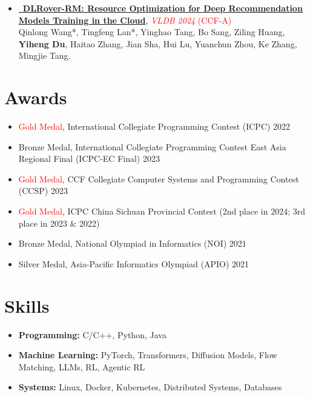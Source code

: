 \documentclass[10pt,a4paper]{article}
\newcommand{\dateright}[1]{\hfill {\small #1}}
\newcommand{\itemtitle}[1]{\textbf{#1}}
\newcommand{\pdficon}{}   %
\begin{document}
\begin{itemize}
  \item \href{https://doi.org/10.14778/3685800.3685832}{\pdficon\ \textbf{DLRover-RM: Resource Optimization for Deep Recommendation Models Training in the Cloud}}, 
  \textcolor{red}{\textit{VLDB 2024} (CCF-A)}\\
  Qinlong Wang*, Tingfeng Lan*, Yinghao Tang, Bo Sang, Ziling Huang, \textbf{Yiheng Du}, Haitao Zhang, Jian Sha, Hui Lu, Yuanchun Zhou, Ke Zhang, Mingjie Tang.
\end{itemize}



\section*{Awards}
\begin{itemize}
  \item \textcolor{red}{Gold Medal}, International Collegiate Programming Contest (ICPC)  \dateright{2022}
  \item Bronze Medal, International Collegiate Programming Contest East Asia Regional Final (ICPC-EC Final) \dateright{2023}
  \item \textcolor{red}{Gold Medal}, CCF Collegiate Computer Systems and Programming Contest (CCSP) \dateright{2023}
  \item \textcolor{red}{Gold Medal}, ICPC China Sichuan Provincial Contest (2nd place in 2024; 3rd place in 2023 \& 2022)
    \item Bronze Medal, National Olympiad in Informatics (NOI) \dateright{2021}
  \item Silver Medal, Asia-Pacific Informatics Olympiad (APIO) \dateright{2021}
\end{itemize}

\section*{Skills}
\begin{itemize}
  \item \itemtitle{Programming:} C/C++, Python, Java
  \item \itemtitle{Machine Learning:} PyTorch, Transformers, Diffusion Models, Flow Matching, LLMs, RL, Agentic RL
  \item \itemtitle{Systems:} Linux, Docker, Kubernetes, Distributed Systems, Databases
\end{itemize}
\end{document}

